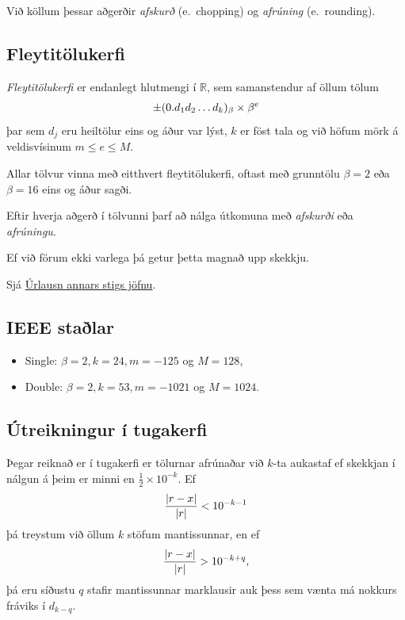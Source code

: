 \documentclass[letterpaper,10pt,icelandic]{sphinxmanual}
\begin{document}
Við köllum þessar aðgerðir \emph{afskurð} (e. chopping) og \emph{afrúning}
(e. rounding).


\subsection{Fleytitölukerfi}
\label{kafli01:fleytitolukerfi}
\emph{Fleytitölukerfi} er endanlegt hlutmengi í \({\mathbb  R}\), sem
samanstendur af öllum tölum
\begin{gather}
\begin{split}\pm (0.d_1d_2\dots d_k)_\beta\times \beta^e\end{split}\notag
\end{gather}
þar sem \(d_j\) eru heiltölur eins og áður var lýst, \(k\) er
föst tala og við höfum mörk á veldisvísinum \(m\leq e\leq M\).

Allar tölvur vinna með eitthvert fleytitölukerfi, oftast með grunntölu
\(\beta=2\) eða \(\beta=16\) eins og áður sagði.

Eftir hverja aðgerð í tölvunni þarf að nálga útkomuna með \emph{afskurði} eða
\emph{afrúningu}.

Ef við förum ekki varlega þá getur þetta magnað upp skekkju.

Sjá {\hyperref[kafli01:urlausn-annars-stigs-jofnu]{Úrlausn annars stigs jöfnu}}.


\subsection{IEEE staðlar}
\label{kafli01:ieee-stalar}\begin{itemize}
\item {} 
Single: \(\beta = 2, k=24, m=-125\) og \(M = 128\),

\item {} 
Double: \(\beta = 2, k=53, m=-1021\) og \(M = 1024\).

\end{itemize}


\subsection{Útreikningur í tugakerfi}
\label{kafli01:utreikningur-i-tugakerfi}
Þegar reiknað er í tugakerfi er tölurnar afrúnaðar við \(k\)-ta
aukastaf ef skekkjan í nálgun á þeim er minni en
\(\frac 12\times 10^{-k}\). Ef
\begin{gather}
\begin{split}\dfrac{|r-x|}{|r|}<10^{-k-1}\end{split}\notag
\end{gather}
þá treystum við öllum \(k\) stöfum mantissunnar, en ef
\begin{gather}
\begin{split}\dfrac{|r-x|}{|r|}>10^{-k+q},\end{split}\notag
\end{gather}
þá eru síðustu \(q\) stafir mantissunnar marklausir auk þess sem
vænta má nokkurs fráviks í \(d_{k-q}\).
\end{document}
